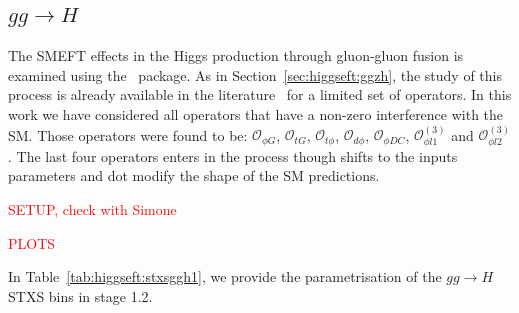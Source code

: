\subsection{$gg\to H$}
\label{sec:higgseft:section3}
The SMEFT effects in the Higgs production through gluon-gluon fusion is examined using the \SMEFTatNLO\ package. As in Section~\ref{sec:higgseft:ggzh}, the 
study of this process is already available in the literature~\cite{Deutschmann:2017qum} for a limited set of operators. In this work we have considered all operators that have a non-zero interference with the SM. Those operators were found to be:
$\mathcal{O}_{\phi G}$, $\mathcal{O}_{tG}$, $\mathcal{O}_{t\phi}$, $\mathcal{O}_{d\phi}$, $\mathcal{O}_{\phi DC}$, $\mathcal{O}_{\phi l1}^{(3)}$ and $\mathcal{O}_{ \phi l2}^{(3)}$.
The last four operators enters in the process though shifts to the inputs parameters and dot modify the shape of the SM predictions.


 \textcolor{red}{ SETUP, check with Simone}


  
 \textcolor{red}{PLOTS}

  

 In Table~\ref{tab:higgseft:stxsggh1}, we provide the parametrisation of the $gg\to H$ STXS bins in stage 1.2.

 
 

